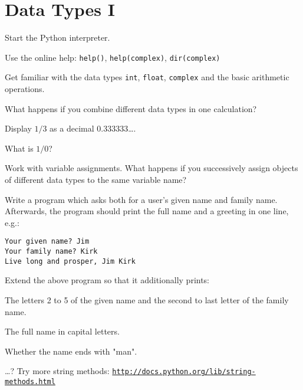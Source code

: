 \section*{Data Types I}

\begin{aufgabe}
Start the Python interpreter.
\begin{auflistung}
\item Use the online help: \lstinline{help()}, \lstinline{help(complex)}, \lstinline{dir(complex)}
\item Get familiar with the data types \texttt{int}, \texttt{float}, \texttt{complex} and the basic arithmetic operations.
\item What happens if you combine different data types in one calculation?
\item Display $1/3$ as a decimal $0.333333$\dots.
\item What is $1/0$?
\item Work with variable assignments. What happens if you successively assign objects of different data types to the same variable name?
\end{auflistung}
\end{aufgabe}

\begin{aufgabe}[Strings]
\begin{teilaufgabe}
Write a program which asks both for a user's given name and family  name. Afterwards, the program should print the full name and a greeting in one line, e.g.:
\begin{lstlisting}
Your given name? Jim
Your family name? Kirk
Live long and prosper, Jim Kirk
\end{lstlisting}
\end{teilaufgabe}

\newpage

\begin{teilaufgabe}
Extend the above program so that it additionally prints:
\begin{auflistung}
\item The letters 2 to 5 of the given name and the second to last letter of the family name.
\item The full name in capital letters.
\item Whether the name ends with "man".
\item \dots ? Try more string methods: \texttt{\underline{http://docs.python.org/lib/string-methods.html}}
\end{auflistung}
\end{teilaufgabe}
\end{aufgabe}

